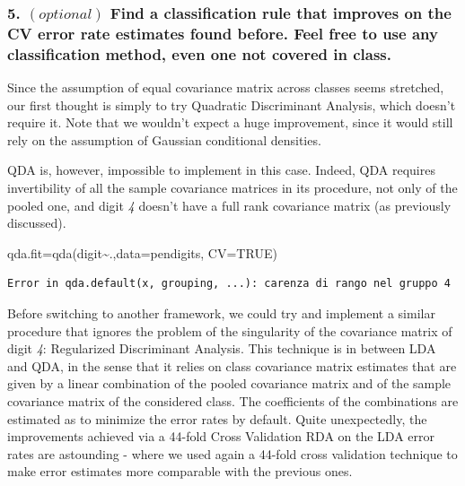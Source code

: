 \documentclass[
  letterpaper,
  DIV=11,
  numbers=noendperiod]{scrartcl}
\newenvironment{Shaded}{\begin{snugshade}}{\end{snugshade}}
\newcommand{\AttributeTok}[1]{\textcolor[rgb]{0.40,0.45,0.13}{#1}}
\newcommand{\ConstantTok}[1]{\textcolor[rgb]{0.56,0.35,0.01}{#1}}
\newcommand{\FunctionTok}[1]{\textcolor[rgb]{0.28,0.35,0.67}{#1}}
\newcommand{\NormalTok}[1]{\textcolor[rgb]{0.00,0.23,0.31}{#1}}
\newcommand{\OtherTok}[1]{\textcolor[rgb]{0.00,0.23,0.31}{#1}}
\newcommand{\SpecialCharTok}[1]{\textcolor[rgb]{0.37,0.37,0.37}{#1}}
\begin{document}
\hypertarget{optional-find-a-classification-rule-that-improves-on-the-cv-error-rate-estimates-found-before.-feel-free-to-use-any-classification-method-even-one-not-covered-in-class.}{%
\subsubsection{\texorpdfstring{5. \((optional)\) Find a classification
rule that improves on the CV error rate estimates found before. Feel
free to use any classification method, even one not covered in
class.}{5. (optional) Find a classification rule that improves on the CV error rate estimates found before. Feel free to use any classification method, even one not covered in class.}}\label{optional-find-a-classification-rule-that-improves-on-the-cv-error-rate-estimates-found-before.-feel-free-to-use-any-classification-method-even-one-not-covered-in-class.}}

Since the assumption of equal covariance matrix across classes seems
stretched, our first thought is simply to try Quadratic Discriminant
Analysis, which doesn't require it. Note that we wouldn't expect a huge
improvement, since it would still rely on the assumption of Gaussian
conditional densities.

QDA is, however, impossible to implement in this case. Indeed, QDA
requires invertibility of all the sample covariance matrices in its
procedure, not only of the pooled one, and digit \emph{4} doesn't have a
full rank covariance matrix (as previously discussed).

\begin{Shaded}
\begin{Highlighting}[]
\NormalTok{qda.fit}\OtherTok{=}\FunctionTok{qda}\NormalTok{(digit}\SpecialCharTok{\textasciitilde{}}\NormalTok{.,}\AttributeTok{data=}\NormalTok{pendigits, }\AttributeTok{CV=}\ConstantTok{TRUE}\NormalTok{)}
\end{Highlighting}
\end{Shaded}

\begin{verbatim}
Error in qda.default(x, grouping, ...): carenza di rango nel gruppo 4
\end{verbatim}

Before switching to another framework, we could try and implement a
similar procedure that ignores the problem of the singularity of the
covariance matrix of digit \emph{4}: Regularized Discriminant Analysis.
This technique is in between LDA and QDA, in the sense that it relies on
class covariance matrix estimates that are given by a linear combination
of the pooled covariance matrix and of the sample covariance matrix of
the considered class. The coefficients of the combinations are estimated
as to minimize the error rates by default. Quite unexpectedly, the
improvements achieved via a 44-fold Cross Validation RDA on the LDA
error rates are astounding - where we used again a 44-fold cross
validation technique to make error estimates more comparable with the
previous ones.
\end{document}
